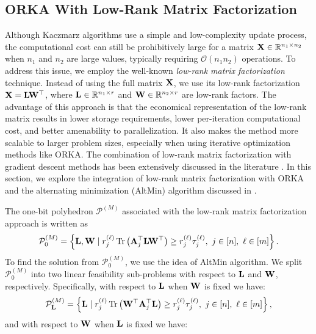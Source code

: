\documentclass[12pt,draftcls,onecolumn]{IEEEtran}
\begin{document}
\subsection{ORKA With Low-Rank Matrix Factorization}
\label{matrixfactor}
Although Kaczmarz algorithms use a simple and low-complexity update process, the computational cost can still be prohibitively large for a matrix $\mathbf{X}\in\mathbb{R}^{n_1\times n_2}$ when $n_1$ and $n_2$ are large values, typically requiring $\mathcal{O}\left(n_1 n_2\right)$ operations. To address this issue, we employ the well-known \emph{low-rank matrix factorization} technique. Instead of using the full matrix $\mathbf{X}$, we use its low-rank factorization $\mathbf{X}=\mathbf{L}\mathbf{W}^{\top}$, where $\mathbf{L}\in\mathbb{R}^{n_1\times r}$ and $\mathbf{W}\in\mathbb{R}^{n_2\times r}$ are low-rank factors. The advantage of this approach is that the economical representation of the low-rank matrix results in lower storage requirements, lower per-iteration computational cost, and better amenability to parallelization. It also makes the method more scalable to larger problem sizes, especially when using iterative optimization methods like ORKA. %
The combination of low-rank matrix factorization with gradient descent methods has been extensively discussed in the literature \cite{chi2019nonconvex}. In this section, we explore the integration of low-rank matrix factorization with ORKA and the alternating minimization (AltMin) algorithm discussed in \cite{jain2010guaranteed}. 

The one-bit polyhedron $\mathcal{P}^{(M)}$ associated with the low-rank matrix factorization approach is written as
\begin{equation}
\label{kvm_15}
\mathcal{P}^{(M)}_0=\left\{\mbL, \mbW \mid r^{(\ell)}_{j}\operatorname{Tr}\left(\mbA^{\top}_j\mbL\mbW^{\top}\right)\geq r^{(\ell)}_{j}\tau^{(\ell)}_{j},~j\in[n],~\ell\in [m]\right\}.
\end{equation}
To find the solution from $\mathcal{P}^{(M)}_0$, we use the idea of AltMin algorithm. We split $\mathcal{P}^{(M)}_0$ into two linear feasibility sub-problems with respect to $\mathbf{L}$ and $\mathbf{W}$, respectively. Specifically, with respect to $\mathbf{L}$ when $\mathbf{W}$ is fixed we have:
\begin{equation}
\label{kvm_16}
\mathcal{P}^{(M)}_{\mbL}=\left\{\mbL\mid r^{(\ell)}_{j}\operatorname{Tr}\left(\mbW^{\top}\mbA^{\top}_j\mbL\right)\geq r^{(\ell)}_{j}\tau^{(\ell)}_{j},~j\in[n],~\ell\in [m]\right\},
\end{equation}
and with respect to $\mathbf{W}$ when $\mathbf{L}$ is fixed we have:
\end{document}
